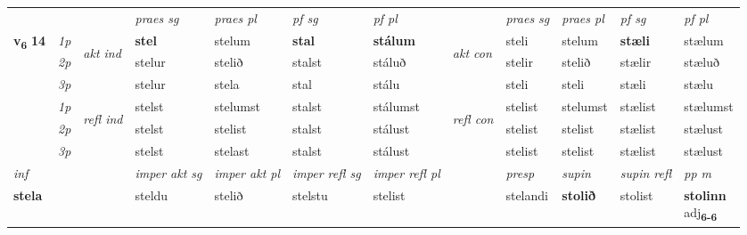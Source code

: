 \begin{longtable}[l]{X>{\footnotesize\itshape}llXXXXlXXXX}
 & &   & \textit{praes sg}  & \textit{praes pl}    & \textit{ pf sg} & \textit{pf pl} & & \textit{praes sg}  & \textit{praes pl}    & \textit{pf sg} & \textit{pf pl }  \\ \cmidrule{4-7} \cmidrule{9-12}
 \multirow{2}{*}{{{\textbf{v{\textsubscript{6}}} \Large{\textbf{14}}}}}  & 1p & \multirow{3}{*}{\begin{turn}{90}\textit{akt ind}\end{turn}} & \textbf{stel} & stelum & \textbf{stal} & \textbf{stálum} & \multirow{3}{*}{\begin{turn}{90}\textit{akt con}\end{turn}} &steli & stelum & \textbf{stæli} & stælum\\*
 & 2p &  &  stelur  & stelið & stalst & stáluð & & stelir & stelið & stælir & stæluð \\*
 & 3p &  & stelur & stela & stal & stálu & & steli & steli& stæli & stælu \\*
\cmidrule{4-7} \cmidrule{9-12}
 & 1p & \multirow{3}{*}{\begin{turn}{90}\textit{refl ind}\end{turn}}  & stelst & stelumst & stalst & stálumst & \multirow{3}{*}{\begin{turn}{90}\textit{refl con}\end{turn}}  &stelist & stelumst & stælist & stælumst \\*
 & 2p &  & stelst & stelist & stalst & stálust & &stelist & stelist & stælist & stælust \\*
 & 3p  & & stelst & stelast & stalst & stálust & & stelist & stelist& stælist & stælust \\*
\cmidrule{4-7} \cmidrule{9-12}

   {\textit{inf}} & &  & \textit{imper akt sg} & \textit{imper akt pl} & \textit{imper refl sg} & \textit{imper refl pl} && \textit{presp} & \textit{supin} & \textit{supin refl} & \textit{pp m} \\*
  {\textbf{stela}} & && steldu  & stelið & stelstu & stelist && stelandi &  \textbf{stolið} & stolist & \specialcell{\textbf{stolinn} \\ adj\textbf{\textsubscript{6-6}}} \\*

\midrule


\end{longtable}
